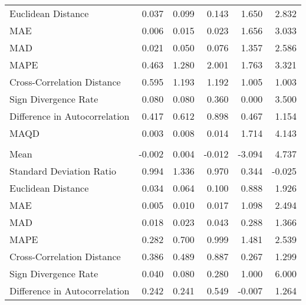 \begin{landscape}
\begin{ThreePartTable}
\begin{longtable}[t]{lrrrrr}
\hspace{1em}Euclidean Distance & 0.037 & 0.099 & 0.143 & 1.650 & 2.832\\
\hspace{1em}MAE & 0.006 & 0.015 & 0.023 & 1.656 & 3.033\\
\hspace{1em}MAD & 0.021 & 0.050 & 0.076 & 1.357 & 2.586\\
\hspace{1em}MAPE & 0.463 & 1.280 & 2.001 & 1.763 & 3.321\\
\hspace{1em}Cross-Correlation Distance & 0.595 & 1.193 & 1.192 & 1.005 & 1.003\\
\hspace{1em}Sign Divergence Rate & 0.080 & 0.080 & 0.360 & 0.000 & \vphantom{1} 3.500\\
\hspace{1em}Difference in Autocorrelation & 0.417 & 0.612 & 0.898 & 0.467 & 1.154\\
\hspace{1em}MAQD & 0.003 & 0.008 & 0.014 & 1.714 & 4.143\\
\addlinespace[0.5em]
\multicolumn{6}{l}{\textbf{LUX}}\\
\hline
\hspace{1em}Mean & -0.002 & 0.004 & -0.012 & -3.094 & 4.737\\
\hspace{1em}Standard Deviation Ratio & 0.994 & 1.336 & 0.970 & 0.344 & -0.025\\
\hspace{1em}Euclidean Distance & 0.034 & 0.064 & 0.100 & 0.888 & 1.926\\
\hspace{1em}MAE & 0.005 & 0.010 & 0.017 & 1.098 & 2.494\\
\hspace{1em}MAD & 0.018 & 0.023 & 0.043 & 0.288 & 1.366\\
\hspace{1em}MAPE & 0.282 & 0.700 & 0.999 & 1.481 & 2.539\\
\hspace{1em}Cross-Correlation Distance & 0.386 & 0.489 & 0.887 & 0.267 & 1.299\\
\hspace{1em}Sign Divergence Rate & 0.040 & 0.080 & 0.280 & 1.000 & 6.000\\
\hspace{1em}Difference in Autocorrelation & 0.242 & 0.241 & 0.549 & -0.007 & 1.264\\

\end{longtable}
\end{ThreePartTable}
\end{landscape}
